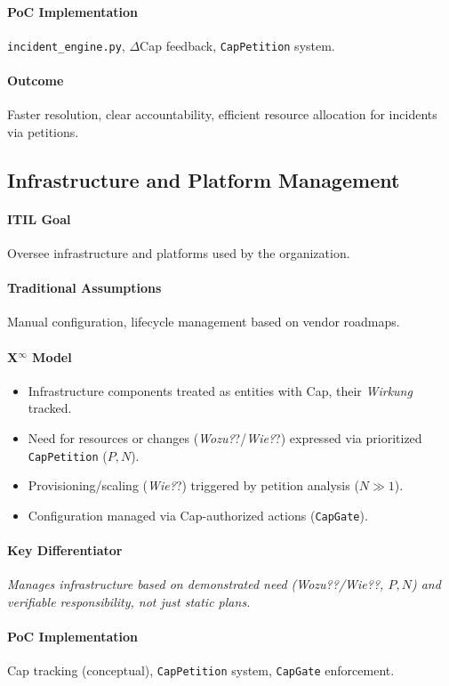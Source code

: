 \documentclass[12pt, a4paper]{scrartcl}
\newcommand{\Xinf}{X$^\infty$}                        %
\newcommand{\DeltaCap}{$\Delta$Cap}                    %
\newcommand{\Wirkung}{\textit{Wirkung}}                 %
\newcommand{\CapGate}{\texttt{CapGate}}
\newcommand{\CapPetition}{\texttt{CapPetition}}        %
\newcommand{\Wozu}{\textit{Wozu?}}                      %
\newcommand{\Wie}{\textit{Wie?}}                        %
\begin{document}
\paragraph{PoC Implementation} \texttt{incident\_engine.py}, \DeltaCap{} feedback, \CapPetition{} system.
\paragraph{Outcome} Faster resolution, clear accountability, efficient resource allocation for incidents via petitions.

\subsection{Infrastructure and Platform Management} %
\paragraph{ITIL Goal} Oversee infrastructure and platforms used by the organization.
\paragraph{Traditional Assumptions} Manual configuration, lifecycle management based on vendor roadmaps.
\paragraph*{\Xinf{} Model}
\begin{itemize}
    \item Infrastructure components treated as entities with Cap, their \Wirkung{} tracked.
    \item Need for resources or changes (\Wozu?/\Wie?) expressed via prioritized \CapPetition{} ($P, N$).
    \item Provisioning/scaling (\Wie?) triggered by petition analysis ($N \gg 1$).
    \item Configuration managed via Cap-authorized actions (\CapGate{}).
\end{itemize}
\paragraph{Key Differentiator} \textit{Manages infrastructure based on demonstrated need (\Wozu?/\Wie?, $P,N$) and verifiable responsibility, not just static plans.}
\paragraph{PoC Implementation} Cap tracking (conceptual), \CapPetition{} system, \CapGate{} enforcement.
\end{document}
